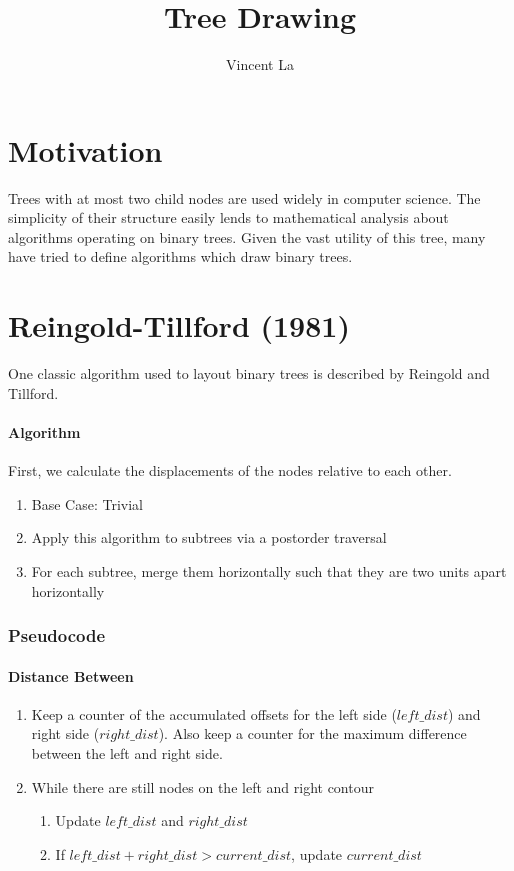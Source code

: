 \documentclass[11pt]{article}
\title{Tree Drawing}
\author{Vincent La}
\begin{document}
\maketitle

\section*{Motivation}
Trees with at most two child nodes are used widely in computer science. The simplicity of their structure easily lends to mathematical analysis about algorithms operating on binary trees. Given the vast utility of this tree, many have tried to define algorithms which draw binary trees.

\section*{Reingold-Tillford (1981)}
One classic algorithm used to layout binary trees is described by Reingold and Tillford. 

\begin{figure}[H]
    \centering
    \def\svgwidth{\columnwidth}
    
\end{figure}

\paragraph{Algorithm}

First, we calculate the displacements of the nodes relative to each other.

\begin{enumerate}
    \item Base Case: Trivial
    \item Apply this algorithm to subtrees via a postorder traversal
    \item For each subtree, merge them horizontally such that they are two units apart horizontally
\end{enumerate}

\subsubsection*{Pseudocode}

\paragraph{Distance Between}
\begin{enumerate}
    \item Keep a counter of the accumulated offsets for the left side ($left\_dist$) and right side ($right\_dist$). Also keep a counter for the maximum difference between the left and right side.
    \item While there are still nodes on the left and right contour
    \begin{enumerate}
        \item Update $left\_dist$ and $right\_dist$
        \item If $left\_dist + right\_dist > current\_dist$, update $current\_dist$
    \end{enumerate}
\end{enumerate}
\end{document}
